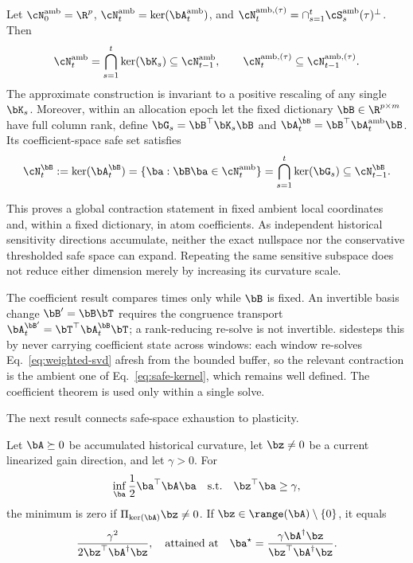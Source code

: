 \begin{theorem}
\label{thm:safe-subspace}
Let $\cN_0^{\mathrm{amb}}=\R^p$,
$\cN_t^{\mathrm{amb}}=\ker(\bA_t^{\mathrm{amb}})$, and
$\cN_t^{\mathrm{amb},(\tau)}=\cap_{s=1}^{t}
\cS_s^{\mathrm{amb}}(\tau)^\perp$. Then
\begin{equation}
  \cN_t^{\mathrm{amb}}=\bigcap_{s=1}^{t}\ker(\bK_s)
  \subseteq\cN_{t-1}^{\mathrm{amb}},
  \qquad
  \cN_t^{\mathrm{amb},(\tau)}
  \subseteq\cN_{t-1}^{\mathrm{amb},(\tau)}.
  \label{eq:safe-kernel}
\end{equation}
The approximate construction is invariant to a positive rescaling of any
single $\bK_s$. Moreover, within an allocation epoch let the fixed dictionary
$\bB\in\R^{p\times m}$ have full column rank, define
$\bG_s=\bB^\top\bK_s\bB$ and
$\bA_t^{\bB}=\bB^\top\bA_t^{\mathrm{amb}}\bB$. Its coefficient-space safe set
satisfies
\begin{equation}
  \cN_t^{\bB}:=\ker(\bA_t^{\bB})
  =\{\ba:\bB\ba\in\cN_t^{\mathrm{amb}}\}
  =\bigcap_{s=1}^{t}\ker(\bG_s)
  \subseteq\cN_{t-1}^{\bB}.
  \label{eq:coefficient-safe-kernel}
\end{equation}
\end{theorem}

This proves a global contraction statement in fixed ambient local coordinates
and, within a fixed dictionary, in atom coefficients. As independent
historical sensitivity directions accumulate, neither the exact nullspace nor
the conservative thresholded safe space can expand. Repeating the same
sensitive subspace does not reduce either dimension merely by increasing its
curvature scale.

The coefficient result compares times only while $\bB$ is fixed. An invertible basis change
$\bB'=\bB\bT$ requires the congruence transport
$\bA_t^{\bB'}=\bT^\top\bA_t^{\bB}\bT$; a rank-reducing re-solve is not invertible.
\method{} sidesteps this by never carrying coefficient state across windows: each
window re-solves Eq.~\eqref{eq:weighted-svd} afresh from the bounded buffer, so
the relevant contraction is the ambient one of Eq.~\eqref{eq:safe-kernel}, which
remains well defined. The coefficient theorem is used only within a single
solve.

The next result connects safe-space exhaustion to plasticity.

\begin{proposition}
\label{prop:price-useful-update}
Let $\bA\succeq0$ be accumulated historical curvature, let $\bz\neq0$ be a
current linearized gain direction, and let $\gamma>0$. For
\begin{equation}
  \inf_{\ba}\frac12\ba^\top\bA\ba
  \quad\text{s.t.}\quad \bz^\top\ba\geq\gamma,
  \label{eq:price-problem}
\end{equation}
the minimum is zero if
$\Pi_{\ker(\bA)}\bz\neq0$. If
$\bz\in\range(\bA)\setminus\{0\}$, it equals
\begin{equation}
  \frac{\gamma^2}{2\bz^\top\bA^\dagger\bz},
  \quad\text{attained at}\quad
  \ba^\star=\frac{\gamma\bA^\dagger\bz}
  {\bz^\top\bA^\dagger\bz}.
  \label{eq:price-solution}
\end{equation}
\end{proposition}

